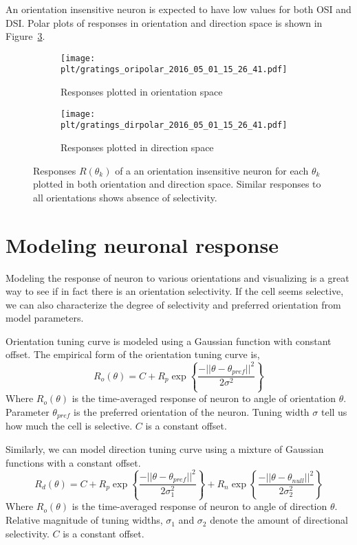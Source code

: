\documentclass[MTech]{iitmdiss}
\newcommand{\plt}{thesis_plots}
\begin{document}
An orientation insensitive neuron is expected to have low values for both OSI and DSI. Polar plots of responses in orientation and direction space is shown in Figure~\ref{fig:oridir_unsel}.
\begin{figure}[h]
  \begin{subfigure}[b]{0.5\textwidth}
    \texttt{[image: \\plt/gratings\_oripolar\_2016\_05\_01\_15\_26\_41.pdf]}
    \caption{Responses plotted in orientation space}
    \label{fig:ori_unsel}
  \end{subfigure}%
  \begin{subfigure}[b]{0.5\textwidth}
    \texttt{[image: \\plt/gratings\_dirpolar\_2016\_05\_01\_15\_26\_41.pdf]}
    \caption{Responses plotted in direction space}
    \label{fig:dir_unsel}
  \end{subfigure}%
  \caption{Responses $R(\theta_k)$ of a an orientation insensitive neuron for each $\theta_k$ plotted in both orientation and direction space. Similar responses to all orientations shows absence of selectivity.}\label{fig:oridir_unsel}
\end{figure}

\section{Modeling neuronal response} %
\label{sec:modeling_neuronal_response_to_sinusoidal_gratings_stimuli}
Modeling the response of neuron to various orientations and visualizing is a great way to see if in fact there is an orientation selectivity. If the cell seems selective, we can also characterize the degree of selectivity and preferred orientation from model parameters.

Orientation tuning curve is modeled using a Gaussian function with constant offset. The empirical form of the orientation tuning curve is,
$$R_o(\theta) = C + R_p \exp\left\{\frac{-||\theta-\theta_{pref}||^2}{2\sigma^2}\right\}$$
Where $R_o(\theta)$ is the time-averaged response of neuron to angle of orientation $\theta$. Parameter $\theta_{pref}$ is the preferred orientation of the neuron. Tuning width $\sigma$  tell us how much the cell is selective. $C$ is a constant offset.

Similarly, we can model direction tuning curve using a mixture of Gaussian functions with a constant offset. 
$$R_d(\theta) = C + R_p \exp\left\{\frac{-||\theta-\theta_{pref}||^2}{2\sigma_1^2}\right\} + R_n \exp\left\{\frac{-||\theta-\theta_{null}||^2}{2\sigma_2^2}\right\}$$
Where $R_o(\theta)$ is the time-averaged response of neuron to angle of direction $\theta$. Relative magnitude of tuning widths, $\sigma_1$ and $\sigma_2$ denote the amount of directional selectivity. $C$ is a constant offset.
\end{document}
